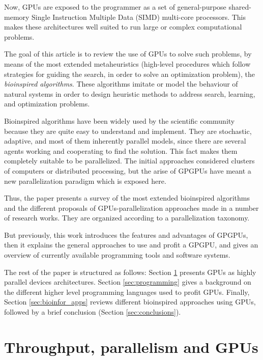 \documentclass[review]{elsarticle}
\begin{document}
Now, GPUs are exposed to the programmer as a set of general-purpose shared-memory Single Instruction Multiple Data (SIMD) multi-core processors. This makes these architectures well suited to run large or complex computational problems. 

The goal of this article is to review the use of GPUs to solve such problems, by means of the most extended metaheuristics (high-level procedures which follow strategies for guiding the search, in order to solve an optimization problem), the \textit{bioinspired algorithms}. These algorithms imitate or model the behaviour of natural systems in order to design heuristic methods to address search, learning, and optimization problems.

Bioinspired algorithms have been widely used by the scientific community because they are quite easy to understand and implement. They are stochastic, adaptive, and most of them inherently parallel models, since there are several agents working and cooperating to find the solution. This fact makes them completely suitable to be parallelized. The initial approaches considered clusters of computers or distributed processing, but the arise of GPGPUs have meant a new parallelization paradigm which is exposed here.

Thus, the paper presents a survey of the most extended bioinspired algorithms and the different proposals of GPUs-parallelization approaches made in a number of research works. They are organized according to a parallelization taxonomy.

But previously, this work introduces the features and advantages of GPGPUs, then it explains the general approaches to use and profit a GPGPU, and gives an overview of currently available programming tools and software systems.

The rest of the paper is structured as follows: Section \ref{sec:parall_and_GPUs} presents GPUs as highly parallel devices architectures.
Section \ref{sec:programming} gives a background on the different
higher level programming languages used to profit GPUs. Finally,
Section \ref{sec:bioinfor_apps} reviews different bioinspired
approaches using GPUs, followed by a brief conclusion (Section
\ref{sec:conclusions}). 

\section{Throughput, parallelism and GPUs}
\label{sec:parall_and_GPUs}
\end{document}

